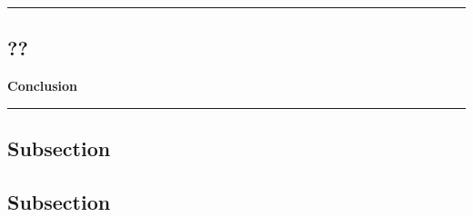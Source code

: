{\color{gray}\hrule}
\begin{center}
\section{??}
\textbf{Conclusion}
\bigskip
\end{center}
{\color{gray}\hrule}
\begin{multicols}{2}
\subsection{Subsection}
\lipsum[1]
\subsection{Subsection}
\lipsum[1-3]
\end{multicols}